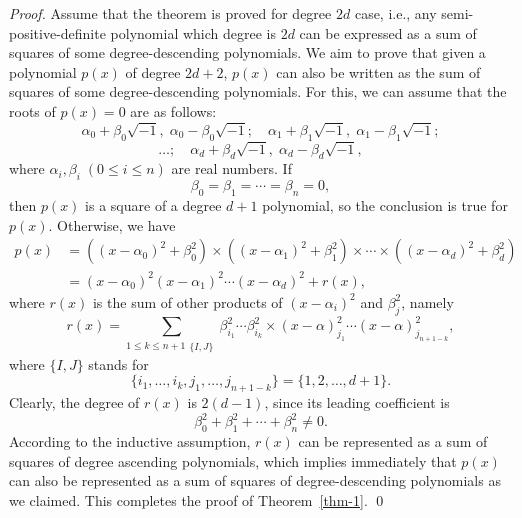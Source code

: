 \documentclass[runningheads]{llncs}
\begin{document}
\begin{proof}
Assume that the theorem is proved for degree $2d$ case, i.e., any semi-positive-definite polynomial which degree is $2d$ can be expressed as a sum of squares of some degree-descending polynomials. We aim to prove that given a polynomial $p(x)$ of degree $2d+2$, $p(x)$ can also be written as the sum of squares of some degree-descending polynomials. For this, we can assume that the roots of $p(x)=0$ are as follows:  
$$
\alpha_0 + \beta_0 \sqrt{-1}, \; \alpha_0 - \beta_0 \sqrt{-1}; \quad 
\alpha_1 + \beta_1 \sqrt{-1}, \; \alpha_1 - \beta_1 \sqrt{-1}; 
$$
$$
\ldots; \quad 
\alpha_d + \beta_d \sqrt{-1}, \; \alpha_d - \beta_d \sqrt{-1},
$$
where $\alpha_i, \beta_i \; (0 \leq i \leq n)$ are real numbers. If 
$$
\beta_0=\beta_1=\cdots=\beta_n=0,
$$
then $p(x)$ is a square of a degree $d+1$ polynomial, so the conclusion is true for $p(x)$. Otherwise, we have
\begin{align}
p(x) &= \left( (x - \alpha_0)^2 + \beta_0^2 \right) \times \left( (x - \alpha_1)^2 + \beta_1^2 \right) \times \cdots \times \left( (x - \alpha_d)^2 + \beta_d^2 \right) \nonumber \\
&= (x - \alpha_0)^2(x - \alpha_1)^2 \cdots (x - \alpha_d)^2 +  r(x),
\label{eq-pxr}
\end{align}
where $r(x)$ is the sum of other products of $(x-\alpha_i)^2$ and $\beta_j^2$, namely
\begin{equation}
r(x)=\sum_{{1\leq k\leq n+1}\substack {\{I,J\}}} \beta_{i_1}^2\cdots\beta_{i_k}^2
\times 
(x-\alpha)_{j_1}^2\cdots (x-\alpha)_{j_{n+1-k}}^2,
\label{residual}
\end{equation}
where $\{I,J\}$ stands for 
$$
\{i_1,\ldots,i_k,j_1,\ldots,j_{n+1-k}\}
=\{1,2,\ldots,d+1\}.
$$
Clearly, the degree of $r(x)$ is $2(d-1)$, since its leading coefficient is 
$$
\beta_0^2+\beta_1^2+\cdots+\beta_{n}^2\not=0. 
$$
According to the inductive assumption, $r(x)$ can be represented as a sum of squares of degree ascending polynomials, which implies immediately that $p(x)$ can also be represented as a sum of squares of degree-descending polynomials as we claimed. 
This completes the proof of Theorem~\ref{thm-1}. \qed
\end{proof}
\end{document}
